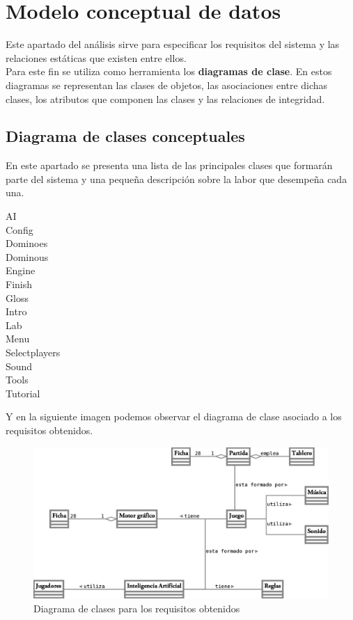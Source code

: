 \section{Modelo conceptual de datos}

Este apartado del análisis sirve para especificar los requisitos del sistema y las relaciones estáticas que
existen entre ellos. \\

Para este fin se utiliza como herramienta los \textbf{diagramas de clase}. En estos diagramas se representan
las clases de objetos, las asociaciones entre dichas clases, los atributos que componen las clases y las
relaciones de integridad.

\subsection{Diagrama de clases conceptuales}

En este apartado se presenta una lista de las principales clases que formarán parte del sistema y una pequeña
descripción sobre la labor que desempeña cada una.

\begin{description}
    \item[AI]
    \item[Config]
    \item[Dominoes]
    \item[Dominous]
    \item[Engine]
    \item[Finish]
    \item[Gloss]
    \item[Intro]
    \item[Lab]
    \item[Menu]
    \item[Selectplayers]
    \item[Sound]
    \item[Tools]
    \item[Tutorial]
\end{description}

Y en la siguiente imagen podemos observar el diagrama de clase asociado a los requisitos obtenidos.

\begin{figure}[h]
  \label{diagrama_clases}
  \begin{center}
    \includegraphics[scale=0.18]{diagrama_clases.png}
  \end{center}
  \caption{Diagrama de clases para los requisitos obtenidos}
\end{figure}


